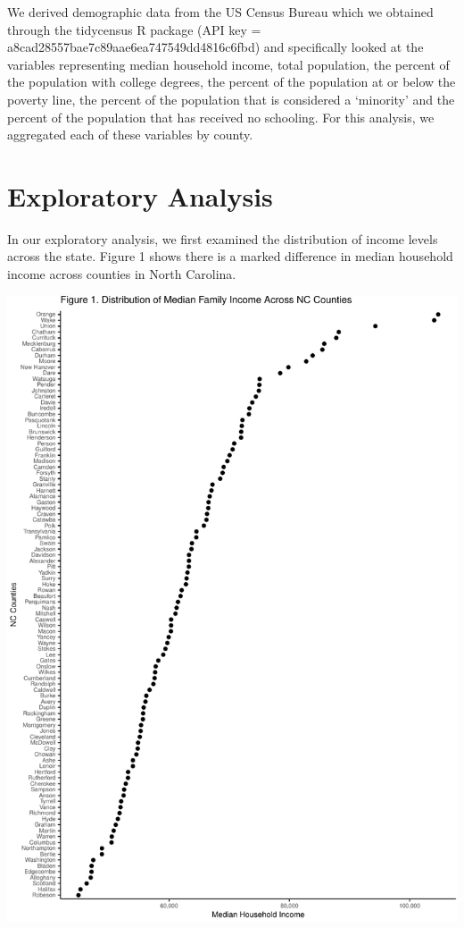 \documentclass[
  12pt,
]{article}
\begin{document}
We derived demographic data from the US Census Bureau which we obtained
through the tidycensus R package (API key =
a8cad28557bae7c89aae6ea747549dd4816c6fbd) and specifically looked at the
variables representing median household income, total population, the
percent of the population with college degrees, the percent of the
population at or below the poverty line, the percent of the population
that is considered a `minority' and the percent of the population that
has received no schooling. For this analysis, we aggregated each of
these variables by county.

\newpage

\hypertarget{exploratory-analysis}{%
\section{Exploratory Analysis}\label{exploratory-analysis}}

In our exploratory analysis, we first examined the distribution of
income levels across the state. Figure 1 shows there is a marked
difference in median household income across counties in North Carolina.

\includegraphics{Project_files/figure-latex/unnamed-chunk-1-1.pdf}
\end{document}
